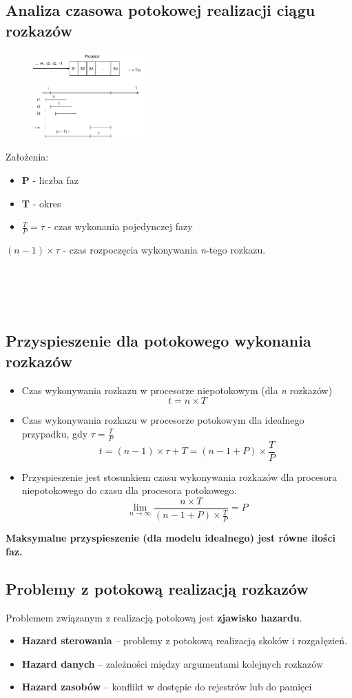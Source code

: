 \documentclass[a4paper,twoside]{article}
\begin{document}
\subsection{Analiza czasowa potokowej realizacji ciągu rozkazów}
\begin{figure}
	\includegraphics[width=0.38\textwidth]{./images/potok03}
\end{figure}
Założenia:
\begin{itemize}
	\item \textbf{P} - liczba faz
	\item \textbf{T} - okres
	\item $\frac{T}{P}=\tau $ - czas wykonania pojedynczej fazy
\end{itemize}
$(n-1)\times\tau$ - czas rozpoczęcia wykonywania \emph{n}-tego rozkazu.\\\\\\\\\\
\subsection{Przyspieszenie dla potokowego wykonania rozkazów}
\begin{itemize}
	\item Czas wykonywania rozkazu w procesorze niepotokowym (dla \emph{n} rozkazów)
	$$t=n\times T$$
	\item Czas wykonywania rozkazu w procesorze potokowym dla idealnego przypadku, gdy $\tau=\frac{T}{P}$\\
	$$t=(n-1)\times\tau+T=(n-1+P)\times\frac{T}{P}$$
	\item Przyspieszenie jest stosunkiem czasu wykonywania rozkazów dla procesora niepotokowego do czasu dla procesora potokowego.
	$$\lim_{n \to \infty}\frac{n\times T}{(n-1+P)\times\frac{T}{P}}=P$$
\end{itemize}
\textbf{	Maksymalne przyspieszenie (dla modelu idealnego) jest równe ilości faz.}
\subsection{Problemy z potokową realizacją rozkazów}
Problemem związanym z realizacją potokową jest \textbf{zjawisko hazardu}.
\begin{itemize}
	\item \textbf{Hazard sterowania }– problemy z potokową realizacją skoków i rozgałęzień.
	\item \textbf{Hazard danych} – zależności między argumentami kolejnych rozkazów
	\item \textbf{Hazard zasobów} – konflikt w dostępie do rejestrów lub do pamięci
\end{itemize}
\end{document}
